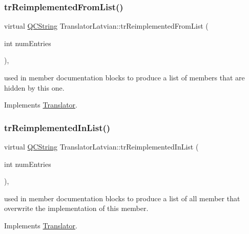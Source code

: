 \subsubsection{\texorpdfstring{trReimplementedFromList()}{trReimplementedFromList()}}
{\footnotesize\ttfamily virtual \mbox{\hyperlink{class_q_c_string}{Q\+C\+String}} Translator\+Latvian\+::tr\+Reimplemented\+From\+List (\begin{DoxyParamCaption}\item[{int}]{num\+Entries }\end{DoxyParamCaption})\hspace{0.3cm}{\ttfamily [inline]}, {\ttfamily [virtual]}}

used in member documentation blocks to produce a list of members that are hidden by this one. 

Implements \mbox{\hyperlink{class_translator}{Translator}}.

\mbox{\label{class_translator_latvian_a01648054f14b27fe72eb8a4a85ab1c28}} 
\subsubsection{\texorpdfstring{trReimplementedInList()}{trReimplementedInList()}}
{\footnotesize\ttfamily virtual \mbox{\hyperlink{class_q_c_string}{Q\+C\+String}} Translator\+Latvian\+::tr\+Reimplemented\+In\+List (\begin{DoxyParamCaption}\item[{int}]{num\+Entries }\end{DoxyParamCaption})\hspace{0.3cm}{\ttfamily [inline]}, {\ttfamily [virtual]}}

used in member documentation blocks to produce a list of all member that overwrite the implementation of this member. 

Implements \mbox{\hyperlink{class_translator}{Translator}}.

\mbox{\label{class_translator_latvian_a1deea29bb96c93b1cc1487dcfe2b3cb8}} 
